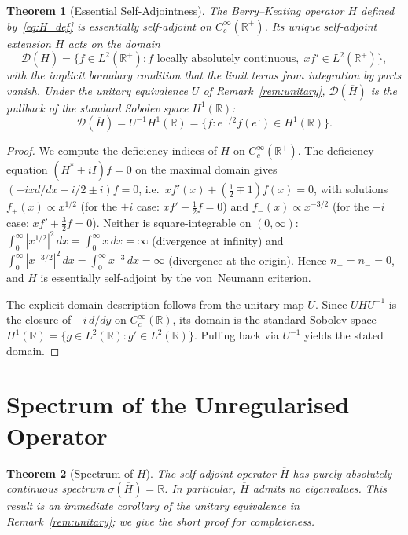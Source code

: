 \documentclass{pre-aomart}
\theoremstyle{plain}
\newtheorem{theorem}{Theorem}[section]
\theoremstyle{definition}
\theoremstyle{remark}
\begin{document}
\begin{theorem}[Essential Self-Adjointness]\label{thm:esa}
The Berry--Keating operator $H$ defined by~\eqref{eq:H_def} is essentially
self-adjoint on $C_c^\infty(\mathbb{R}^+)$.  Its unique self-adjoint extension
$\overline{H}$ acts on the domain
\[
\mathcal{D}(\overline{H})
= \bigl\{f \in L^2(\mathbb{R}^+) : f \text{ locally absolutely continuous},\;
x f' \in L^2(\mathbb{R}^+)\bigr\},
\]
with the implicit boundary condition that the limit terms from integration by
parts vanish.  Under the unitary equivalence $U$ of Remark~\ref{rem:unitary},
$\mathcal{D}(\overline{H})$ is the pullback of the standard Sobolev space
$H^1(\mathbb{R})$:
\[
\mathcal{D}(\overline{H}) = U^{-1} H^1(\mathbb{R})
= \bigl\{f : e^{\,\cdot/2}f(e^{\,\cdot}) \in H^1(\mathbb{R})\bigr\}.
\]
\end{theorem}

\begin{proof}
We compute the deficiency indices of $H$ on $C_c^\infty(\mathbb{R}^+)$.
The deficiency equation $(H^* \pm iI)f = 0$ on the maximal domain gives
$(-i x d/dx - i/2 \pm i)f = 0$, i.e.\
$x f'(x) + (\frac{1}{2} \mp 1)f(x) = 0$, with solutions
$f_+(x) \propto x^{1/2}$ (for the $+i$ case: $x f' - \frac{1}{2}f = 0$)
and $f_-(x) \propto x^{-3/2}$ (for the $-i$ case: $x f' + \frac{3}{2}f = 0$).
Neither is square-integrable on $(0,\infty)$:
$\int_0^\infty |x^{1/2}|^2\,dx = \int_0^\infty x\,dx = \infty$ (divergence at infinity) and
$\int_0^\infty |x^{-3/2}|^2\,dx = \int_0^\infty x^{-3}\,dx = \infty$ (divergence at the origin).
Hence $n_+ = n_- = 0$, and $H$ is essentially self-adjoint by the
von~Neumann criterion.

The explicit domain description follows from the unitary map $U$.
Since $U\overline{H}U^{-1}$ is the closure of $-i\,d/dy$ on
$C_c^\infty(\mathbb{R})$, its domain is the standard Sobolev space
$H^1(\mathbb{R}) = \{g \in L^2(\mathbb{R}) : g' \in L^2(\mathbb{R})\}$.
Pulling back via $U^{-1}$ yields the stated domain.
\end{proof}

\section{Spectrum of the Unregularised Operator}
\label{sec:spectrum}

\begin{theorem}[Spectrum of $H$]\label{thm:spec}
The self-adjoint operator $\overline{H}$ has purely absolutely continuous spectrum
$\sigma(\overline{H}) = \mathbb{R}$.  In particular, $\overline{H}$ admits no eigenvalues.
This result is an immediate corollary of the unitary equivalence in
Remark~\ref{rem:unitary}; we give the short proof for completeness.
\end{theorem}
\end{document}
